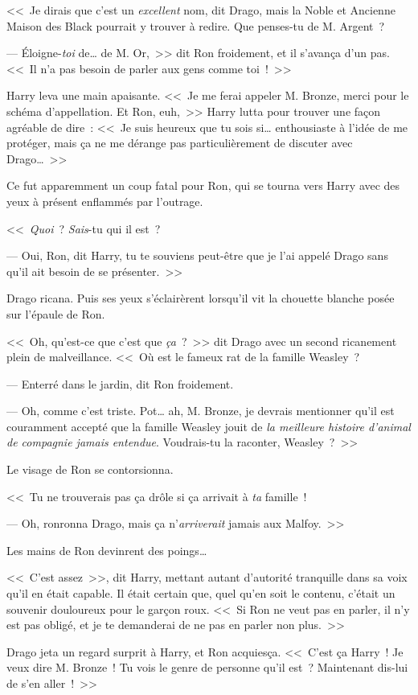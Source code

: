 <<~Je dirais que c'est un \emph{excellent} nom, dit Drago, mais la Noble et Ancienne Maison des Black pourrait y trouver à redire. Que penses-tu de M. Argent~?

--- Éloigne-\emph{toi} de… de M. Or,~>> dit Ron froidement, et il s'avança d'un pas. <<~Il n'a pas besoin de parler aux gens comme toi~!~>>

Harry leva une main apaisante. <<~Je me ferai appeler M. Bronze, merci pour le schéma d'appellation. Et Ron, euh,~>> Harry lutta pour trouver une façon agréable de dire~: <<~Je suis heureux que tu sois si… enthousiaste à l'idée de me protéger, mais ça ne me dérange pas particulièrement de discuter avec Drago…~>>

Ce fut apparemment un coup fatal pour Ron, qui se tourna vers Harry avec des yeux à présent enflammés par l'outrage.

<<~\emph{Quoi}~? \emph{Sais}-tu qui il est~?

--- Oui, Ron, dit Harry, tu te souviens peut-être que je l'ai appelé Drago sans qu'il ait besoin de se présenter.~>>

Drago ricana. Puis ses yeux s'éclairèrent lorsqu'il vit la chouette blanche posée sur l'épaule de Ron.

<<~Oh, qu'est-ce que c'est que \emph{ça}~?~>> dit Drago avec un second ricanement plein de malveillance. <<~Où est le fameux rat de la famille Weasley~?

--- Enterré dans le jardin, dit Ron froidement.

--- Oh, comme c'est triste. Pot… ah, M. Bronze, je devrais mentionner qu'il est couramment accepté que la famille Weasley jouit de \emph{la meilleure histoire d'animal de compagnie jamais entendue}. Voudrais-tu la raconter, Weasley~?~>>

Le visage de Ron se contorsionna.

<<~Tu ne trouverais pas ça drôle si ça arrivait à \emph{ta} famille~!

--- Oh, ronronna Drago, mais ça n'\emph{arriverait} jamais aux Malfoy.~>>

Les mains de Ron devinrent des poings…

<<~C'est assez~>>, dit Harry, mettant autant d'autorité tranquille dans sa voix qu'il en était capable. Il était certain que, quel qu'en soit le contenu, c'était un souvenir douloureux pour le garçon roux. <<~Si Ron ne veut pas en parler, il n'y est pas obligé, et je te demanderai de ne pas en parler non plus.~>>

Drago jeta un regard surprit à Harry, et Ron acquiesça. <<~C'est ça Harry~! Je veux dire M. Bronze~! Tu vois le genre de personne qu'il est~? Maintenant dis-lui de s'en aller~!~>>

